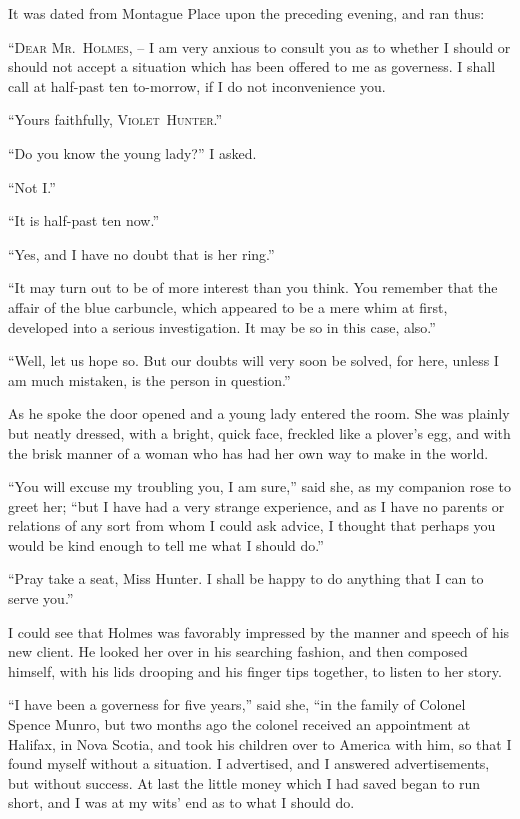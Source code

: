 It was dated from Montague Place upon the preceding
evening, and ran thus:

\begin{letter}
“\textsc{Dear Mr.~Holmes}, -- I am very anxious to consult you as
to whether I should or should not accept a situation which
has been offered to me as governess. I shall call at half-past
ten to-morrow, if I do not inconvenience you.

\hspace{2em}“Yours faithfully, \hfill\textsc{Violet~Hunter}.”
\end{letter}

“Do you know the young lady?” I asked.

“Not I.”

“It is half-past ten now.”

“Yes, and I have no doubt that is her ring.”

“It may turn out to be of more interest than you think.
You remember that the affair of the blue carbuncle, which
appeared to be a mere whim at first, developed into a serious
investigation. It may be so in this case, also.”

“Well, let us hope so. But our doubts will very soon be
solved, for here, unless I am much mistaken, is the person in
question.”

As he spoke the door opened and a young lady entered the
room. She was plainly but neatly dressed, with a bright,
quick face, freckled like a plover’s egg, and with the brisk
manner of a woman who has had her own way to make in the
world.

“You will excuse my troubling you, I am sure,” said she,
as my companion rose to greet her; “but I have had a very
strange experience, and as I have no parents or relations of
any sort from whom I could ask advice, I thought that perhaps
you would be kind enough to tell me what I should do.”

“Pray take a seat, Miss Hunter. I shall be happy to do
anything that I can to serve you.”

I could see that Holmes was favorably impressed by the
manner and speech of his new client. He looked her over in
his searching fashion, and then composed himself, with his lids
drooping and his finger tips together, to listen to her story.

“I have been a governess for five years,” said she, “in the
family of Colonel Spence Munro, but two months ago the
colonel received an appointment at Halifax, in Nova Scotia,
and took his children over to America with him, so that I
found myself without a situation. I advertised, and I answered
advertisements, but without success. At last the little money
which I had saved began to run short, and I was at my wits’
end as to what I should do.

